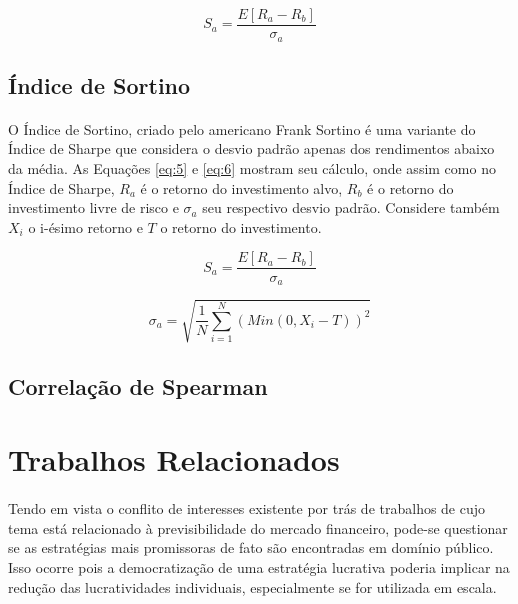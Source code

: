 \begin{equation} \label{eq:1}
    S_a = \frac{E[R_a - R_b]}{\sigma_a}
\end{equation}

\subsection{Índice de Sortino}

\paragraph{} O Índice de Sortino, criado pelo americano Frank Sortino \cite{rollinger2013sortino} é uma variante do Índice de Sharpe que considera o desvio padrão apenas dos rendimentos abaixo da média. As Equações \ref{eq:5} e \ref{eq:6} mostram seu cálculo, onde assim como no Índice de Sharpe, \begin{math}R_a\end{math} é o retorno do investimento alvo, \begin{math}R_b\end{math} é o retorno do investimento livre de risco e \begin{math}\sigma_a\end{math} seu respectivo desvio padrão. Considere também \begin{math}X_i\end{math} o i-ésimo retorno e \begin{math}T\end{math} o retorno do investimento.

\begin{equation} \label{eq:5}
    S_a = \frac{E[R_a - R_b]}{\sigma_a}
\end{equation}

\begin{equation} \label{eq:6}
    \sigma_a = \sqrt{ \frac{1}{N} \sum_{i=1}^{N} (Min(0, X_i-T))^2}
\end{equation}

\subsection{Correlação de Spearman}


\section{Trabalhos Relacionados}

\paragraph{} Tendo em vista o conflito de interesses existente por trás de trabalhos de cujo tema está relacionado à previsibilidade do mercado financeiro, pode-se questionar se as estratégias mais promissoras de fato são encontradas em domínio público. Isso ocorre pois a democratização de uma estratégia lucrativa poderia implicar na redução das lucratividades individuais, especialmente se for utilizada em escala.

